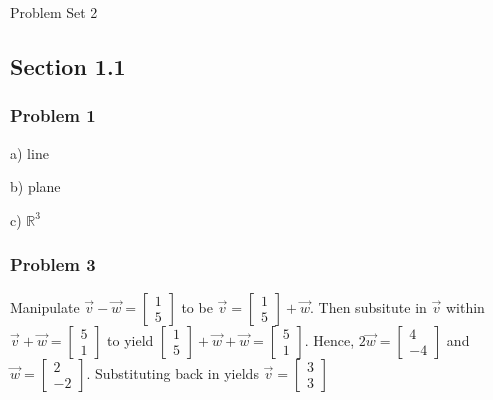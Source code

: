\documentclass[12pt]{article}
\begin{document}
\begin{center}
    Problem Set 2
\end{center}

\subsection*{Section 1.1}

\subsubsection*{Problem 1}
a) line

\noindent b) plane

\noindent c) $\mathbb{R}^3$

\subsubsection*{Problem 3}
Manipulate $\vec{v} - \vec{w} = \begin{bmatrix} 1 \\ 5 \end{bmatrix}$ to be 
$\vec{v} = \begin{bmatrix} 1 \\ 5 \end{bmatrix} + \vec{w}$. Then subsitute in $\vec{v}$ 
within $\vec{v} + \vec{w} = \begin{bmatrix} 5 \\ 1 \end{bmatrix}$ to yield 
$\begin{bmatrix} 1 \\ 5 \end{bmatrix} + \vec{w} + \vec{w} = \begin{bmatrix} 5 \\ 1 \end{bmatrix}$. 
Hence, $2\vec{w} = \begin{bmatrix} 4 \\ -4 \end{bmatrix}$ and 
$\vec{w} = \begin{bmatrix} 2 \\ -2 \end{bmatrix}$. Substituting back in yields
$\vec{v} = \begin{bmatrix} 3 \\ 3 \end{bmatrix}$
\end{document}
